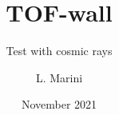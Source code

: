 \title[TOF-wall]{TOF-wall}
\subtitle[]{Test with cosmic rays}
\author[L. Marini, INFN Pisa ]{L. Marini} 
\date[November 2021]{November 2021}
